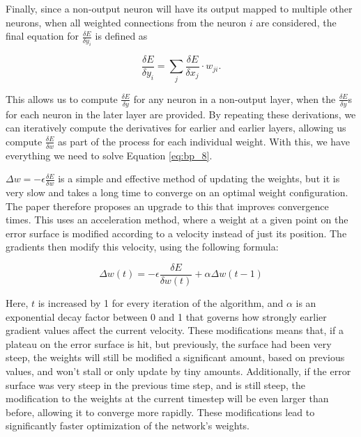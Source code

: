 \documentclass[11pt,a4paper,oldfontcommands]{memoir}
\begin{document}
Finally, since a non-output neuron will have its output mapped to multiple other neurons, when all weighted connections from the neuron $i$ are considered, the final equation for $\frac{\delta E}{\delta y_i}$ is defined as

\begin{equation}
    \frac{\delta E}{\delta y_i} = \sum_j \frac{\delta E}{\delta x_j} \cdot w_{ji} .
    \label{eq:bp_7}
\end{equation}

This allows us to compute $\frac{\delta E}{\delta y}$ for any neuron in a non-output layer, when the $\frac{\delta E}{\delta y}$s for each neuron in the later layer are provided. By repeating these derivations, we can iteratively compute the derivatives for earlier and earlier layers, allowing us compute $\frac{\delta E}{\delta w}$ as part of the process for each individual weight. With this, we have everything we need to solve Equation \ref{eq:bp_8}.

$\Delta w = -\epsilon\frac{\delta E}{\delta w}$ is a simple and effective method of updating the weights, but it is very slow and takes a long time to converge on an optimal weight configuration. The paper \cite{backprop} therefore proposes an upgrade to this that improves convergence times. This uses an acceleration method, where a weight at a given point on the error surface is modified according to a velocity instead of just its position. The gradients then modify this velocity, using the following formula:

\begin{equation}
    \Delta w(t) = -\epsilon\frac{\delta E}{\delta w(t)} + \alpha \Delta w(t-1)
    \label{eq:bp_9}
\end{equation}

Here, $t$ is increased by 1 for every iteration of the algorithm, and $\alpha$ is an exponential decay factor between 0 and 1 that governs how strongly earlier gradient values affect the current velocity. These modifications means that, if a plateau on the error surface is hit, but previously, the surface had been very steep, the weights will still be modified a significant amount, based on previous values, and won't stall or only update by tiny amounts. Additionally, if the error surface was very steep in the previous time step, and is still steep, the modification to the weights at the current timestep will be even larger than before, allowing it to converge more rapidly. These modifications lead to significantly faster optimization of the network's weights. 
\end{document}
